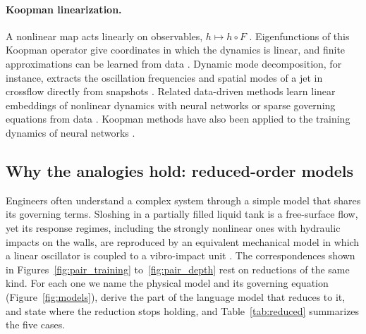 \paragraph{Koopman linearization.} A nonlinear map acts linearly on observables, $h\mapsto h\circ F$ \citep{koopman1931hamiltonian}. Eigenfunctions of this Koopman operator give coordinates in which the dynamics is linear, and finite approximations can be learned from data \citep{mezic2005spectral}. Dynamic mode decomposition, for instance, extracts the oscillation frequencies and spatial modes of a jet in crossflow directly from snapshots \citep{rowley2009spectral}. Related data-driven methods learn linear embeddings of nonlinear dynamics with neural networks \citep{lusch2017deep} or sparse governing equations from data \citep{brunton2015discovering}. Koopman methods have also been applied to the training dynamics of neural networks \citep{dogra2020optimizing,redman2021operator}.

\subsection{Why the analogies hold: reduced-order models}
\label{sec:reduced}



Engineers often understand a complex system through a simple model that shares its governing terms. Sloshing in a partially filled liquid tank is a free-surface flow, yet its response regimes, including the strongly nonlinear ones with hydraulic impacts on the walls, are reproduced by an equivalent mechanical model in which a linear oscillator is coupled to a vibro-impact unit \citep{farid2017response}. The correspondences shown in Figures~\ref{fig:pair_training} to~\ref{fig:pair_depth} rest on reductions of the same kind. For each one we name the physical model and its governing equation (Figure~\ref{fig:models}), derive the part of the language model that reduces to it, and state where the reduction stops holding, and Table~\ref{tab:reduced} summarizes the five cases.

